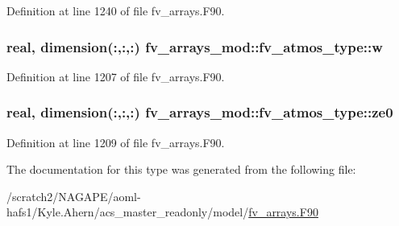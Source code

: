Definition at line 1240 of file fv\-\_\-arrays.\-F90.

\subsubsection[{w}]{\setlength{\rightskip}{0pt plus 5cm}real, dimension(\-:,\-:,\-:) fv\-\_\-arrays\-\_\-mod\-::fv\-\_\-atmos\-\_\-type\-::w}\label{structfv__arrays__mod_1_1fv__atmos__type_a2b0d0ca4a8e622f47bb6ad50f293303c}


Definition at line 1207 of file fv\-\_\-arrays.\-F90.

\subsubsection[{ze0}]{\setlength{\rightskip}{0pt plus 5cm}real, dimension(\-:,\-:,\-:) fv\-\_\-arrays\-\_\-mod\-::fv\-\_\-atmos\-\_\-type\-::ze0}\label{structfv__arrays__mod_1_1fv__atmos__type_a751b4cbe5e6b4662ea5802e39ceebf18}


Definition at line 1209 of file fv\-\_\-arrays.\-F90.



The documentation for this type was generated from the following file\-:\begin{DoxyCompactItemize}
\item 
/scratch2/\-N\-A\-G\-A\-P\-E/aoml-\/hafs1/\-Kyle.\-Ahern/acs\-\_\-master\-\_\-readonly/model/\hyperlink{fv__arrays_8F90}{fv\-\_\-arrays.\-F90}\end{DoxyCompactItemize}
